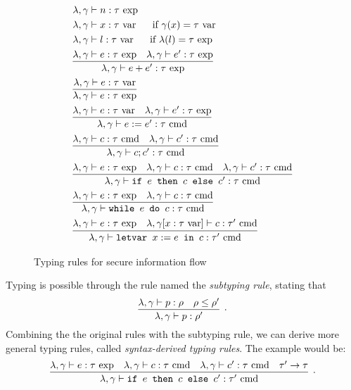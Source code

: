\documentclass{llncs}
\newcommand{\lit}[1]{\mathrm{#1}}
\begin{document}
\begin{figure}
\label{fig:typing-rules}
\begin{align*}
&\lambda, \gamma \vdash n : \tau\ \lit{exp} \\
&\lambda, \gamma \vdash x : \tau\ \lit{var}\ \ \ \ \mbox{ if } \gamma(x) = \tau\ \lit{var} \\
&\lambda, \gamma \vdash l : \tau\ \lit{var}\ \ \ \ \mbox{ if } \lambda(l) = \tau\ \lit{exp} \\
&\infer{\lambda, \gamma \vdash e + e' : \tau\ \lit{exp}}{
	\lambda, \gamma \vdash e : \tau\ \lit{exp}
	&
	\lambda, \gamma \vdash e' : \tau\ \lit{exp}
} \\
&\infer{\lambda, \gamma \vdash e : \tau\ \lit{exp}}{
	\lambda, \gamma \vdash e : \tau\ \lit{var}
} \\
&\infer{\lambda, \gamma \vdash e := e' : \tau\ \lit{cmd}}{
	\lambda, \gamma \vdash e : \tau\ \lit{var}
	&
	\lambda, \gamma \vdash e' : \tau\ \lit{exp}
} \\
&\infer{\lambda, \gamma \vdash c; c' : \tau\ \lit{cmd}}{
	\lambda, \gamma \vdash c : \tau\ \lit{cmd}
	&
	\lambda, \gamma \vdash c' : \tau\ \lit{cmd}
} \\
&\infer{\lambda, \gamma \vdash \mbox{\texttt{if }} e \mbox{\texttt{ then }} c \mbox{\texttt{ else }} c' : \tau\ \lit{cmd}}{
    \lambda, \gamma \vdash e : \tau\ \lit{exp}
    &
    \lambda, \gamma \vdash c : \tau\ \lit{cmd}
    &
    \lambda, \gamma \vdash c' : \tau\ \lit{cmd}
} \\
&\infer{\lambda, \gamma \vdash \mbox{\texttt{while }} e \mbox{\texttt{ do }} c : \tau\ \lit{cmd}}{
    \lambda, \gamma \vdash e : \tau\ \lit{exp}
    &
    \lambda, \gamma \vdash c : \tau\ \lit{cmd}
} \\
&\infer{\lambda, \gamma \vdash \mbox{\texttt{letvar }} x := e \mbox{\texttt{ in }} c : \tau'\ \lit{cmd}}{
    \lambda, \gamma \vdash e : \tau\ \lit{exp}
    &
    \lambda, \gamma[x : \tau\ \lit{var}] \vdash c : \tau'\ \lit{cmd}
}
\end{align*}
\caption{Typing rules for secure information flow}
\end{figure}

Typing is possible through the rule named the \textit{subtyping rule}, stating that
\[
\infer[.]{\lambda, \gamma \vdash p : \rho'}{
    \lambda, \gamma \vdash p : \rho
    &
    \rho \leq \rho'
}
\]
Combining the the original rules with the subtyping rule, we can derive more general typing rules, called \textit{syntax-derived typing rules}. The example would be:
\[
\infer[.]{\lambda, \gamma \vdash \mbox{\texttt{if }} e \mbox{\texttt{ then }} c \mbox{\texttt{ else }} c' : \tau'\ \lit{cmd}}{
    \lambda, \gamma \vdash e : \tau\ \lit{exp}
    &
    \lambda, \gamma \vdash c : \tau\ \lit{cmd}
    &
    \lambda, \gamma \vdash c' : \tau\ \lit{cmd}
    &
    \tau' \rightarrow \tau
}
\]
\end{document}
